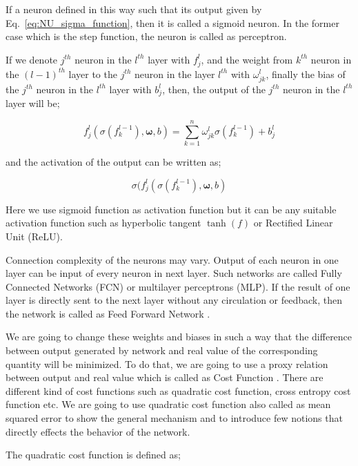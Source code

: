 \documentclass[a4paper,times,hidelinks,12pt]{article}
\begin{document}
\noindent If a neuron defined in this way such that its output given by Eq.~\eqref{eq:NU_sigma_function}, then it is called a sigmoid neuron. In the former case which is the step function, the neuron is called as perceptron. 

If we denote $j^{th}$ neuron in the $l^{th}$ layer with $f_j^l$, and the weight from $k^{th}$ neuron in the $(l-1)^{th}$ layer to the $j^{th}$ neuron in the layer $l^{th}$ with $\omega_{jk}^l$, finally the bias of the $j^{th}$ neuron in the $l^{th}$ layer with ${b_j^l}$, then, the output of the $j^{th}$ neuron in the $l^{th}$ layer will be;

\begin{equation}
\label{eq:NU_neuron_connection}
f_j^{l}(\sigma(f_k^{l-1}), \boldsymbol{\omega}, b) = \sum\limits_{k=1}^{n} \omega_{jk}^{l}\sigma(f_k^{l-1}) + b_j^l
\end{equation}

\noindent and the activation of the output can be written as;

\begin{equation}
\sigma(f_j^{l}(\sigma(f_k^{l-1}), \boldsymbol{\omega}, b)
\end{equation}


\noindent Here we use sigmoid function as activation function but it can be any suitable activation function such as hyperbolic tangent $\tanh(f)$ or Rectified Linear Unit (ReLU).

Connection complexity of the neurons may vary. Output of each neuron in one layer can be input of every neuron in next layer. Such networks are called Fully Connected Networks (FCN) or multilayer perceptrons (MLP). If the result of one layer is directly sent to the next layer without any circulation or feedback, then the network is called as Feed Forward Network \cite{nielsen2015neural}.

We are going to change these weights and biases in such a way that the difference between output generated by network and real value of the corresponding quantity will be minimized. To do that, we are going to use a proxy relation between output and real value which is called as Cost Function \cite{nielsen2015neural}. There are different kind of cost functions such as quadratic cost function, cross entropy cost function etc. We are going to use quadratic cost function also called as mean squared error to show the general mechanism and to introduce few notions that directly effects the behavior of the network. 


The quadratic cost function is defined as;
\end{document}
